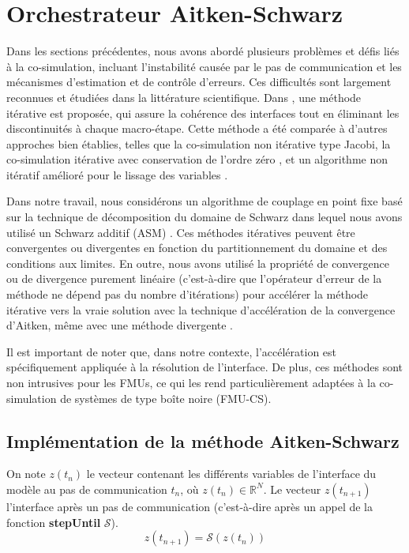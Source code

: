 \section{Orchestrateur Aitken-Schwarz}

Dans les sections précédentes, nous avons abordé plusieurs problèmes et défis liés à la co-simulation, incluant l'instabilité causée par le pas de communication et les mécanismes d'estimation et de contrôle d'erreurs. Ces difficultés sont largement reconnues et étudiées dans la littérature scientifique. Dans \cite{29}, une méthode itérative est proposée, qui assure la cohérence des interfaces tout en éliminant les discontinuités à chaque macro-étape. Cette méthode a été comparée à d'autres approches bien établies, telles que la co-simulation non itérative type Jacobi, la co-simulation itérative avec conservation de l'ordre zéro \cite{b12}, et un algorithme non itératif amélioré pour le lissage des variables \cite{30}. 

Dans notre travail, nous considérons un algorithme de couplage en point fixe basé sur la technique de décomposition du domaine de Schwarz dans lequel nous avons utilisé un Schwarz additif (ASM) \cite{b27}. Ces méthodes itératives peuvent être convergentes ou divergentes en fonction du partitionnement du domaine et des conditions aux limites. En outre, nous avons utilisé la propriété de convergence ou de divergence purement linéaire (c'est-à-dire que l'opérateur d'erreur de la méthode ne dépend pas du nombre d'itérations) pour accélérer la méthode itérative vers la vraie solution avec la technique d'accélération de la convergence d'Aitken, même avec une méthode divergente \cite{b28}.

Il est important de noter que, dans notre contexte, l'accélération est spécifiquement appliquée à la résolution de l'interface. De plus, ces méthodes sont non intrusives pour les FMUs, ce qui les rend particulièrement adaptées à la co-simulation de systèmes de type boîte noire (FMU-CS).



\subsection{Implémentation de la méthode Aitken-Schwarz}

On note $z(t_n)$ le vecteur contenant les différents variables de l’interface du modèle au pas de communication $t_n$, où $z(t_n) \in \mathbb{R}^N$. Le vecteur $z(t_{n+1})$ l'interface après un pas de communication (c'est-à-dire après un appel de la fonction \textbf{stepUntil} $\mathcal{S}$).
\begin{equation}
    z(t_{n+1}) = \mathcal{S} (z(t_n))
\end{equation}

